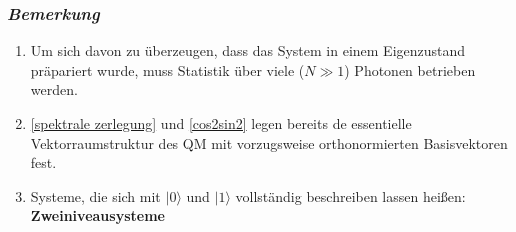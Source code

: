 \subsubsection*{\emph{Bemerkung}}

\begin{enumerate}[(1)]
	\item Um sich davon zu überzeugen, dass das System in einem Eigenzustand präpariert wurde, muss Statistik über viele ($ N \gg 1 $) Photonen betrieben werden.
	\item \eqref{spektrale zerlegung} und \eqref{cos2sin2} legen bereits de essentielle Vektorraumstruktur des QM mit vorzugsweise orthonormierten Basisvektoren fest.
	\item Systeme, die sich mit $ |0\rangle $ und $ |1\rangle $ vollständig beschreiben lassen heißen: \textbf{Zweiniveausysteme}
\end{enumerate}


